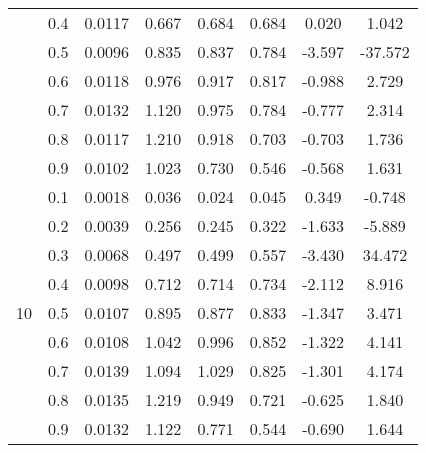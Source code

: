 \documentclass[11pt,a4paper]{report}
\begin{document}
\begin{longtable}{ | c | c || c | c | c | c | c | c | }
 & 0.4 & 0.0117 & 0.667 & 0.684 & 0.684 & 0.020 & 1.042 \\
 & 0.5 & 0.0096 & 0.835 & 0.837 & 0.784 & -3.597 & -37.572 \\
 & 0.6 & 0.0118 & 0.976 & 0.917 & 0.817 & -0.988 & 2.729 \\
 & 0.7 & 0.0132 & 1.120 & 0.975 & 0.784 & -0.777 & 2.314 \\
 & 0.8 & 0.0117 & 1.210 & 0.918 & 0.703 & -0.703 & 1.736 \\
 & 0.9 & 0.0102 & 1.023 & 0.730 & 0.546 & -0.568 & 1.631 \\
 \hline
\multirow{9}{*}{10} & 0.1 & 0.0018 & 0.036 & 0.024 & 0.045 & 0.349 & -0.748 \\
 & 0.2 & 0.0039 & 0.256 & 0.245 & 0.322 & -1.633 & -5.889 \\
 & 0.3 & 0.0068 & 0.497 & 0.499 & 0.557 & -3.430 & 34.472 \\
 & 0.4 & 0.0098 & 0.712 & 0.714 & 0.734 & -2.112 & 8.916 \\
 & 0.5 & 0.0107 & 0.895 & 0.877 & 0.833 & -1.347 & 3.471 \\
 & 0.6 & 0.0108 & 1.042 & 0.996 & 0.852 & -1.322 & 4.141 \\
 & 0.7 & 0.0139 & 1.094 & 1.029 & 0.825 & -1.301 & 4.174 \\
 & 0.8 & 0.0135 & 1.219 & 0.949 & 0.721 & -0.625 & 1.840 \\
 & 0.9 & 0.0132 & 1.122 & 0.771 & 0.544 & -0.690 & 1.644 \\
 \hline
\hline
\end{longtable}
\end{document}
